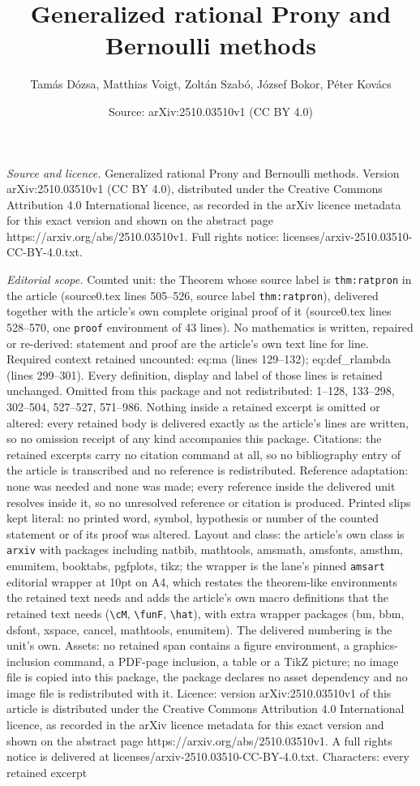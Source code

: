 \documentclass[10pt,a4paper]{amsart}
\title[Generalized rational Prony and Bernoulli methods]{Generalized rational Prony and Bernoulli methods}
\author{Tam\'as D\'ozsa, Matthias Voigt, Zolt\'an Szab\'o, J\'ozsef Bokor, P\'eter Kov\'acs}
\date{Source: arXiv:2510.03510v1 (CC BY 4.0)}
\begin{document}
\maketitle

\noindent\emph{Source and licence.} Generalized rational Prony and Bernoulli methods. Version arXiv:2510.03510v1 (CC BY 4.0), distributed under the Creative Commons Attribution 4.0 International licence, as recorded in the arXiv licence metadata for this exact version and shown on the abstract page https://arxiv.org/abs/2510.03510v1. Full rights notice: licenses/arxiv-2510.03510-CC-BY-4.0.txt.\par\smallskip

\noindent\textit{Editorial scope.} Counted unit: the Theorem whose source label is \texttt{thm:ratpron} in the article (source0.tex lines 505--526, source label \texttt{thm:ratpron}), delivered together with the article's own complete original proof of it (source0.tex lines 528--570, one \texttt{proof} environment of 43 lines). No mathematics is written, repaired or re-derived: statement and proof are the article's own text line for line. Required context retained uncounted: eq:ma (lines 129--132); eq:def\_rlambda (lines 299--301). Every definition, display and label of those lines is retained unchanged. Omitted from this package and not redistributed: 1--128, 133--298, 302--504, 527--527, 571--986. Nothing inside a retained excerpt is omitted or altered: every retained body is delivered exactly as the article's lines are written, so no omission receipt of any kind accompanies this package. Citations: the retained excerpts carry no citation command at all, so no bibliography entry of the article is transcribed and no reference is redistributed. Reference adaptation: none was needed and none was made; every reference inside the delivered unit resolves inside it, so no unresolved reference or citation is produced. Printed slips kept literal: no printed word, symbol, hypothesis or number of the counted statement or of its proof was altered. Layout and class: the article's own class is \texttt{arxiv} with packages including natbib, mathtools, amsmath, amsfonts, amsthm, enumitem, booktabs, pgfplots, tikz; the wrapper is the lane's pinned \texttt{amsart} editorial wrapper at 10pt on A4, which restates the theorem-like environments the retained text needs and adds the article's own macro definitions that the retained text needs (\texttt{\textbackslash cM}, \texttt{\textbackslash funF}, \texttt{\textbackslash hat}), with extra wrapper packages (bm, bbm, dsfont, xspace, cancel, mathtools, enumitem). The delivered numbering is the unit's own. Assets: no retained span contains a figure environment, a graphics-inclusion command, a PDF-page inclusion, a table or a TikZ picture; no image file is copied into this package, the package declares no asset dependency and no image file is redistributed with it. Licence: version arXiv:2510.03510v1 of this article is distributed under the Creative Commons Attribution 4.0 International licence, as recorded in the arXiv licence metadata for this exact version and shown on the abstract page https://arxiv.org/abs/2510.03510v1. A full rights notice is delivered at licenses/arxiv-2510.03510-CC-BY-4.0.txt. Characters: every retained excerpt 
\end{document}

